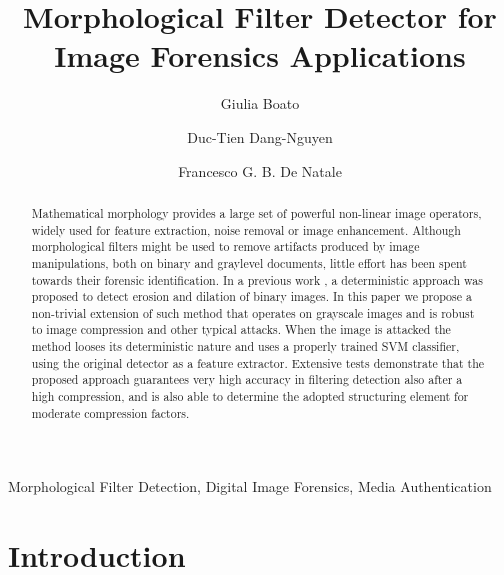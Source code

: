 \documentclass[review]{elsarticle}
\begin{document}
\begin{frontmatter}

\title{Morphological Filter Detector for Image Forensics Applications}

\author[a]{Giulia Boato}
\author[b]{Duc-Tien Dang-Nguyen}
\author[a]{Francesco G. B. De Natale}

\address[a]{University of Trento, Italy}


\address[b]{University of Bergen, Norway}


\begin{abstract}
Mathematical morphology provides a large set of powerful non-linear image operators, widely used for feature extraction, noise removal or image enhancement. Although morphological filters might be used to remove artifacts produced by image manipulations, both on binary and graylevel documents, little effort has been spent towards their forensic identification. In a previous work \cite{de2017detecting}, a deterministic approach was proposed to detect erosion and dilation of binary images. In this paper we propose a non-trivial extension of such method that operates on grayscale images and is robust to image compression and other typical attacks. When the image is attacked the method looses its deterministic nature and uses a properly trained SVM classifier, using the original detector as a feature extractor. Extensive tests demonstrate that the proposed approach guarantees very high accuracy in filtering detection also after a high compression, and is also able to determine the adopted structuring element for moderate compression factors.
\end{abstract}

\begin{keyword}
Morphological Filter Detection, Digital Image Forensics, Media Authentication 
\end{keyword}

\end{frontmatter}

\linenumbers

\section{Introduction}
\label{sec:intro}
\end{document}
